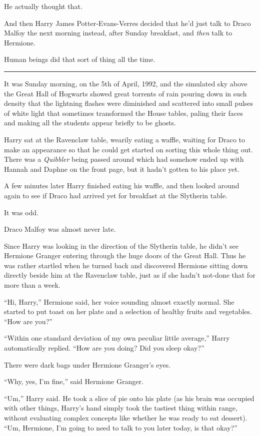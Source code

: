 He actually thought that.

And then Harry James Potter-Evans-Verres decided that he'd just talk to
Draco Malfoy the next morning instead, after Sunday breakfast, and
\emph{then} talk to Hermione.

Human beings did that sort of thing all the time.

\begin{center}\rule{3in}{0.4pt}\end{center}

It was Sunday morning, on the 5th of April, 1992, and the simulated sky
above the Great Hall of Hogwarts showed great torrents of rain pouring
down in such density that the lightning flashes were diminished and
scattered into small pulses of white light that sometimes transformed
the House tables, paling their faces and making all the students appear
briefly to be ghosts.

Harry sat at the Ravenclaw table, wearily eating a waffle, waiting for
Draco to make an appearance so that he could get started on sorting this
whole thing out. There was a \emph{Quibbler} being passed around which
had somehow ended up with Hannah and Daphne on the front page, but it
hadn't gotten to his place yet.

A few minutes later Harry finished eating his waffle, and then looked
around again to see if Draco had arrived yet for breakfast at the
Slytherin table.

It was odd.

Draco Malfoy was almost never late.

Since Harry was looking in the direction of the Slytherin table, he
didn't see Hermione Granger entering through the huge doors of the Great
Hall. Thus he was rather startled when he turned back and discovered
Hermione sitting down directly beside him at the Ravenclaw table, just
as if she hadn't not-done that for more than a week.

``Hi, Harry,'' Hermione said, her voice sounding almost exactly normal.
She started to put toast on her plate and a selection of healthy fruits
and vegetables. ``How are you?''

``Within one standard deviation of my own peculiar little average,''
Harry automatically replied. ``How are you doing? Did you sleep okay?''

There were dark bags under Hermione Granger's eyes.

``Why, yes, I'm fine,'' said Hermione Granger.

``Um,'' Harry said. He took a slice of pie onto his plate (as his brain
was occupied with other things, Harry's hand simply took the tastiest
thing within range, without evaluating complex concepts like whether he
was ready to eat dessert). ``Um, Hermione, I'm going to need to talk to
you later today, is that okay?''

